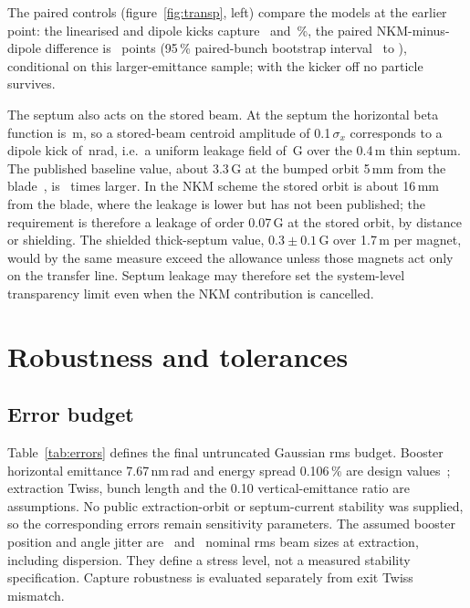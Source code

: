 \documentclass[aps,prab,reprint,amsmath,amssymb,floatfix,longbibliography]{revtex4-2}
\begin{document}
The paired controls (figure~\ref{fig:transp}, left) compare the models at the earlier point: the linearised and dipole kicks capture \ValLinear\ and \ValDipole\,\%, the paired NKM-minus-dipole difference is \ValDiffDipole\ points (95\,\% paired-bunch bootstrap interval \ValDiffDipoleLo\ to \ValDiffDipoleHi), conditional on this larger-emittance sample; with the kicker off no particle survives.

The septum also acts on the stored beam. At the septum the horizontal beta function is \SeptumBetaX\,m, so a stored-beam centroid amplitude of 0.1\,$\sigma_x$ corresponds to a dipole kick of \SeptumAllowKickNrad\,nrad, i.e.\ a uniform leakage field of \SeptumAllowG\,G over the 0.4\,m thin septum. The published baseline value, about 3.3\,G at the bumped orbit 5\,mm from the blade~\cite{Hahn2024}, is \SeptumReduction\ times larger. In the NKM scheme the stored orbit is about 16\,mm from the blade, where the leakage is lower but has not been published; the requirement is therefore a leakage of order 0.07\,G at the stored orbit, by distance or shielding. The shielded thick-septum value, $0.3\pm0.1$\,G over 1.7\,m per magnet, would by the same measure exceed the allowance unless those magnets act only on the transfer line. Septum leakage may therefore set the system-level transparency limit even when the NKM contribution is cancelled.

\section{Robustness and tolerances}
\label{sec:robust}

\subsection{Error budget}

Table~\ref{tab:errors} defines the final untruncated Gaussian rms budget. Booster horizontal emittance 7.67\,nm\,rad and energy spread 0.106\,\% are design values~\cite{Lee2024}; extraction Twiss, bunch length and the 0.10 vertical-emittance ratio are assumptions. No public extraction-orbit or septum-current stability was supplied, so the corresponding errors remain sensitivity parameters. The assumed booster position and angle jitter are \RFiveJitterXBeamUnits\ and \RFiveJitterXpBeamUnits\ nominal rms beam sizes at extraction, including dispersion. They define a stress level, not a measured stability specification. Capture robustness is evaluated separately from exit Twiss mismatch.
\end{document}
